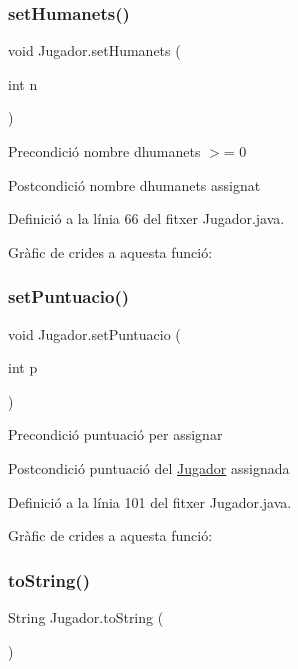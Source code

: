 \subsubsection{\texorpdfstring{set\+Humanets()}{setHumanets()}}
{\footnotesize\ttfamily void Jugador.\+set\+Humanets (\begin{DoxyParamCaption}\item[{int}]{n }\end{DoxyParamCaption})}

\begin{DoxyPrecond}{Precondició}
nombre d\textquotesingle{}humanets $>$= 0 
\end{DoxyPrecond}
\begin{DoxyPostcond}{Postcondició}
nombre d\textquotesingle{}humanets assignat 
\end{DoxyPostcond}


Definició a la línia 66 del fitxer Jugador.\+java.

Gràfic de crides a aquesta funció\+:
\mbox{\label{class_jugador_a9b4f91f35c48eda851a622666c1b93d5}} 
\subsubsection{\texorpdfstring{set\+Puntuacio()}{setPuntuacio()}}
{\footnotesize\ttfamily void Jugador.\+set\+Puntuacio (\begin{DoxyParamCaption}\item[{int}]{p }\end{DoxyParamCaption})}

\begin{DoxyPrecond}{Precondició}
puntuació per assignar 
\end{DoxyPrecond}
\begin{DoxyPostcond}{Postcondició}
puntuació del \mbox{\hyperlink{class_jugador}{Jugador}} assignada 
\end{DoxyPostcond}


Definició a la línia 101 del fitxer Jugador.\+java.

Gràfic de crides a aquesta funció\+:
\mbox{\label{class_jugador_a69e46d6ddf4397e9325d4cdec5bb4253}} 
\subsubsection{\texorpdfstring{to\+String()}{toString()}}
{\footnotesize\ttfamily String Jugador.\+to\+String (\begin{DoxyParamCaption}{ }\end{DoxyParamCaption})}

